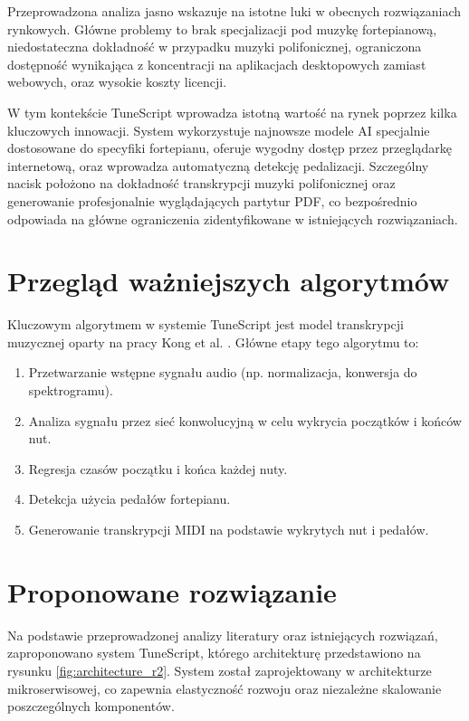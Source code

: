 \documentclass[a4paper,twoside,12pt]{book}
\begin{document}
Przeprowadzona analiza jasno wskazuje na istotne luki w obecnych rozwiązaniach rynkowych. Główne problemy to brak specjalizacji pod muzykę fortepianową, niedostateczna dokładność w przypadku muzyki polifonicznej, ograniczona dostępność wynikająca z koncentracji na aplikacjach desktopowych zamiast webowych, oraz wysokie koszty licencji.

W tym kontekście TuneScript wprowadza istotną wartość na rynek poprzez kilka kluczowych innowacji. System wykorzystuje najnowsze modele AI specjalnie dostosowane do specyfiki fortepianu, oferuje wygodny dostęp przez przeglądarkę internetową, oraz wprowadza automatyczną detekcję pedalizacji. Szczególny nacisk położono na dokładność transkrypcji muzyki polifonicznej oraz generowanie profesjonalnie wyglądających partytur PDF, co bezpośrednio odpowiada na główne ograniczenia zidentyfikowane w istniejących rozwiązaniach.

\section{Przegląd ważniejszych algorytmów}
  
Kluczowym algorytmem w systemie TuneScript jest model transkrypcji muzycznej oparty na pracy Kong et al. \cite{bib:kong2020high}. Główne etapy tego algorytmu to:

\begin{enumerate}
	\item Przetwarzanie wstępne sygnału audio (np. normalizacja, konwersja do spektrogramu).
	\item Analiza sygnału przez sieć konwolucyjną w celu wykrycia początków i końców nut.
	\item Regresja czasów początku i końca każdej nuty.
	\item Detekcja użycia pedałów fortepianu.
	\item Generowanie transkrypcji MIDI na podstawie wykrytych nut i pedałów.
\end{enumerate}

\section{Proponowane rozwiązanie}

Na podstawie przeprowadzonej analizy literatury oraz istniejących rozwiązań, zaproponowano system TuneScript, którego architekturę przedstawiono na rysunku \ref{fig:architecture_r2}. System został zaprojektowany w architekturze mikroserwisowej, co zapewnia elastyczność rozwoju oraz niezależne skalowanie poszczególnych komponentów. 
\end{document}

